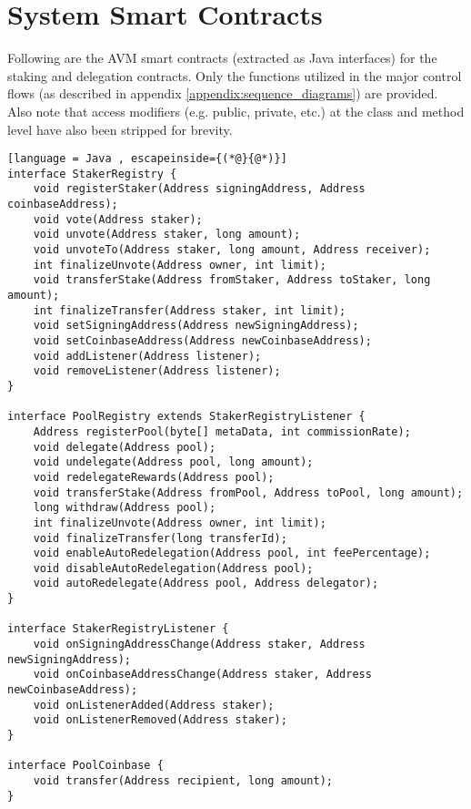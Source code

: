 

\section{System Smart Contracts}
\label{appendix:contract}

Following are the AVM smart contracts (extracted as Java interfaces) for the staking and delegation contracts. Only the functions utilized in the major control flows (as described in appendix \ref{appendix:sequence_diagrams}) are provided. Also note that access modifiers (e.g. public, private, etc.) at the class and method level have also been stripped for brevity.

\begin{lstlisting}[language = Java , escapeinside={(*@}{@*)}]
interface StakerRegistry {
    void registerStaker(Address signingAddress, Address coinbaseAddress);
    void vote(Address staker);
    void unvote(Address staker, long amount);
    void unvoteTo(Address staker, long amount, Address receiver);
    int finalizeUnvote(Address owner, int limit);
    void transferStake(Address fromStaker, Address toStaker, long amount);
    int finalizeTransfer(Address staker, int limit);
    void setSigningAddress(Address newSigningAddress);
    void setCoinbaseAddress(Address newCoinbaseAddress);
    void addListener(Address listener);
    void removeListener(Address listener);
}

interface PoolRegistry extends StakerRegistryListener {
    Address registerPool(byte[] metaData, int commissionRate);
    void delegate(Address pool);
    void undelegate(Address pool, long amount);
    void redelegateRewards(Address pool);
    void transferStake(Address fromPool, Address toPool, long amount);
    long withdraw(Address pool);
    int finalizeUnvote(Address owner, int limit);
    void finalizeTransfer(long transferId);
    void enableAutoRedelegation(Address pool, int feePercentage);
    void disableAutoRedelegation(Address pool);
    void autoRedelegate(Address pool, Address delegator);
}

interface StakerRegistryListener {
    void onSigningAddressChange(Address staker, Address newSigningAddress);
    void onCoinbaseAddressChange(Address staker, Address newCoinbaseAddress);
    void onListenerAdded(Address staker);
    void onListenerRemoved(Address staker);
}

interface PoolCoinbase {
    void transfer(Address recipient, long amount);
}

\end{lstlisting}